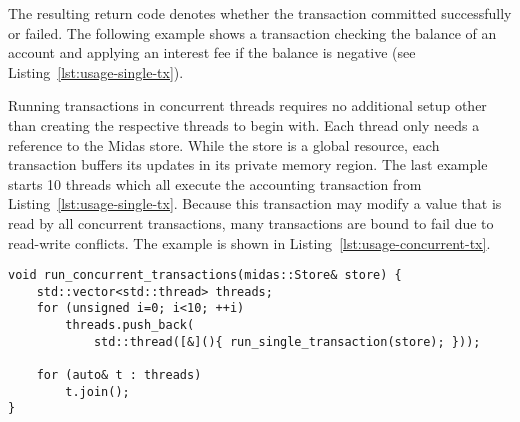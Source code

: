 The resulting return code denotes whether the transaction committed successfully
or failed. The following example shows a transaction checking the balance of an
account and applying an interest fee if the balance is negative (see
Listing~\ref{lst:usage-single-tx}).

Running transactions in concurrent threads requires no additional setup other
than creating the respective threads to begin with. Each thread only needs a
reference to the Midas store. While the store is a global resource, each
transaction buffers its updates in its private memory region. The last example
starts 10 threads which all execute the accounting transaction from
Listing~\ref{lst:usage-single-tx}. Because this transaction may modify a value
that is read by all concurrent transactions, many transactions are bound to fail
due to read-write conflicts. The example is shown in
Listing~\ref{lst:usage-concurrent-tx}.

\vspace{0.5cm}

\begin{lstlisting}[caption={Several concurrent accounting transactions on the same store.},captionpos=b, label=lst:usage-concurrent-tx]
void run_concurrent_transactions(midas::Store& store) {
    std::vector<std::thread> threads;
    for (unsigned i=0; i<10; ++i)
        threads.push_back(
            std::thread([&](){ run_single_transaction(store); }));

    for (auto& t : threads)
        t.join();
}
\end{lstlisting}
